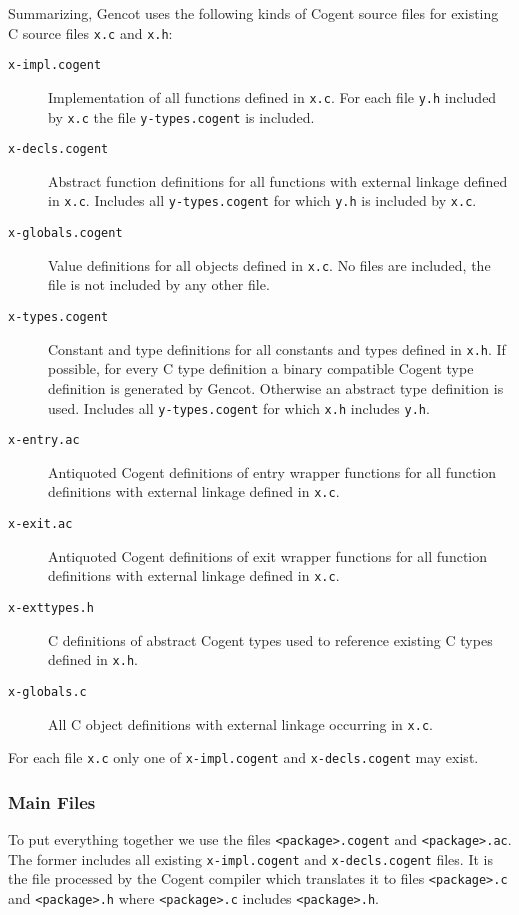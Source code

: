 \documentclass[a4paper]{report}
\newcommand{\code}[1]{\textnormal{\texttt{#1}}}
\begin{document}
Summarizing, Gencot uses the following kinds of Cogent source files for existing C source files \code{x.c} and \code{x.h}:
\begin{description}
\item[\code{x-impl.cogent}] Implementation of all functions defined in \code{x.c}. For each file \code{y.h} included by
  \code{x.c} the file \code{y-types.cogent} is included.
\item[\code{x-decls.cogent}] Abstract function definitions for all functions with external linkage defined in \code{x.c}.
  Includes all \code{y-types.cogent} for which \code{y.h} is included by \code{x.c}. 
\item[\code{x-globals.cogent}] Value definitions for all objects defined in \code{x.c}. No files are included, the file is not
  included by any other file.
\item[\code{x-types.cogent}] Constant and type definitions for all constants and types defined in \code{x.h}. 
  If possible, for every C type definition a binary compatible Cogent type 
  definition is generated by Gencot. Otherwise an abstract type definition is used. Includes
  all \code{y-types.cogent} for which \code{x.h} includes \code{y.h}.
\item[\code{x-entry.ac}] Antiquoted Cogent definitions of entry wrapper functions for all function definitions with external linkage
  defined in \code{x.c}.
\item[\code{x-exit.ac}] Antiquoted Cogent definitions of exit wrapper functions for all function definitions with external linkage
  defined in \code{x.c}.
\item[\code{x-exttypes.h}] C definitions of abstract Cogent types used to reference existing C types defined in \code{x.h}.
\item[\code{x-globals.c}] All C object definitions with external linkage occurring in \code{x.c}.
\end{description}
For each file \code{x.c} only one of \code{x-impl.cogent} and \code{x-decls.cogent} may exist.

\subsubsection{Main Files}

To put everything together we use the files \code{<package>.cogent} and \code{<package>.ac}. The former includes all 
existing \code{x-impl.cogent} and \code{x-decls.cogent} files.
It is the file processed by the Cogent compiler which translates it to files \code{<package>.c} 
and \code{<package>.h} where \code{<package>.c} includes \code{<package>.h}. 
\end{document}
